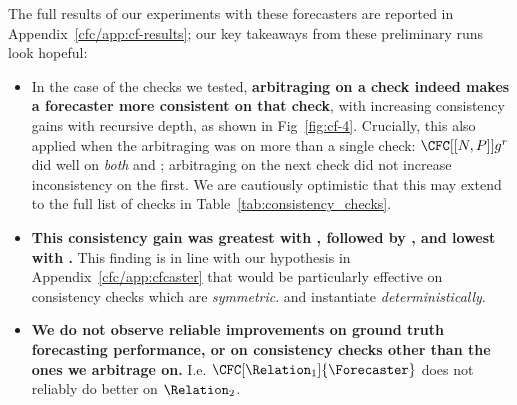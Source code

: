 The full results of our experiments with these forecasters are reported in Appendix~\ref{cfc/app:cf-results}; our key takeaways from these preliminary runs look hopeful:

\begin{itemize}
    \item In the case of the checks we tested, \textbf{arbitraging on a check indeed makes a forecaster more consistent on that check}, with increasing consistency gains with recursive depth, as shown in Fig~\ref{fig:cf-4}. Crucially, this also applied when the arbitraging was on more than a single check: $\CFC[[N,P]]{g}^r$ did well on \emph{both} \NegChecker{} and \ParaphraseChecker{}; arbitraging on the next check did not increase inconsistency on the first. We are cautiously optimistic that this may extend to the full list of checks in Table~\ref{tab:consistency_checks}.
    \item \textbf{This consistency gain was greatest with \NegChecker{}, followed by \ParaphraseChecker{}, and lowest with \ExpectedEvidenceChecker{}.} This finding is in line with our hypothesis in Appendix~\ref{cfc/app:cfcaster} that \CFCaster{} would be particularly effective on consistency checks which are \emph{symmetric}. and instantiate \emph{deterministically}.
    \item \textbf{We do not observe reliable improvements on ground truth forecasting performance, or on consistency checks other than the ones we arbitrage on.}
    I.e. $\CFC[\Relation_1]{\Forecaster}$ does not reliably do better on $\Relation_2$.
\end{itemize}

